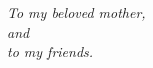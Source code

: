 \newpage
\thispagestyle{empty} \vspace*{2.5in}
\begin{center}
\emph{To my beloved mother, \\
and \\ to my friends.}
\end{center}
